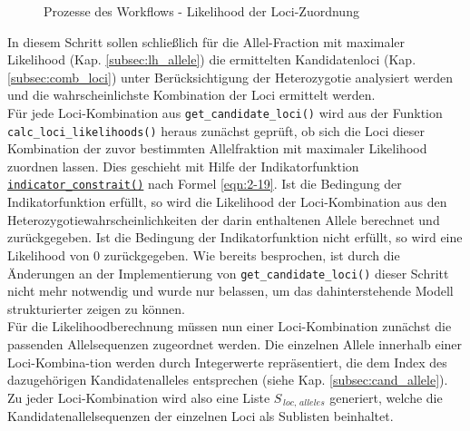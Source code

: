 \begin{figure}[h]
\begin{center}
		\caption{Prozesse des Workflows - Likelihood der Loci-Zuordnung \cite{tikz_schema, bootstrap}}
		\label{fig:workflow_all}
	\end{center}
\end{figure}

In diesem Schritt sollen schließlich für die Allel-Fraction mit maximaler Likelihood (Kap. \ref{subsec:lh_allele}) die ermittelten Kandidatenloci (Kap. \ref{subsec:comb_loci}) unter Berücksichtigung der Heterozygotie analysiert werden und die wahrscheinlichste Kombination der Loci ermittelt werden.\\

Für jede Loci-Kombination aus \lstinline|get_candidate_loci()| wird aus der Funktion \linebreak \lstinline|calc_loci_likelihoods()| heraus zunächst geprüft, ob sich die Loci dieser Kombination der zuvor bestimmten Allelfraktion mit maximaler Likelihood zuordnen lassen. Dies geschieht mit Hilfe der Indikatorfunktion \hyperref[schritt14b]{\lstinline|indicator_constrait()|\label{schritt14btxt}} nach Formel \eqref{eqn:2-19}. Ist die Bedingung der Indikatorfunktion erfüllt, so wird die Likelihood der Loci-Kombination aus den Heterozygotiewahrscheinlichkeiten der darin enthaltenen Allele berechnet und zurückgegeben. Ist die Bedingung der Indikatorfunktion nicht erfüllt, so wird eine Likelihood von 0 zurückgegeben. Wie bereits besprochen, ist durch die Änderungen an der Implementierung von \lstinline|get_candidate_loci()| dieser Schritt nicht mehr notwendig und wurde nur belassen, um das dahinterstehende Modell strukturierter zeigen zu können.\\

Für die Likelihoodberechnung müssen nun einer Loci-Kombination zunächst die passenden Allelsequenzen zugeordnet werden. Die einzelnen Allele innerhalb einer Loci-Kombina-tion werden durch Integerwerte repräsentiert, die dem Index des dazugehörigen Kandidatenalleles entsprechen (siehe Kap. \ref{subsec:cand_allele}). Zu jeder Loci-Kombination wird also eine Liste $ S_{\,loc,\, alleles} $ generiert, welche die Kandidatenallelsequenzen der einzelnen Loci als Sublisten beinhaltet.\\

